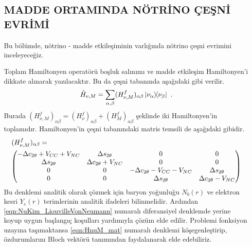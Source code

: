 \subsection{MADDE ORTAMINDA NÖTRİNO ÇEŞNİ EVRİMİ}\label{subsec:MaddeOrtamindaNuEvrimi}
\paragraph{}
Bu bölümde, nötrino - madde etkileşiminin varlığında nötrino çeşni evrimini inceleyeceğiz.

Toplam Hamiltonyen operatörü boşluk salınımı ve madde etkileşim Hamiltonyen'i dikkate alınarak yazılacaktır. Bu da çeşni tabanında aşağıdaki gibi verilir.
\begin{equation}
	\hat{H}_{\nu,M} = \sum_{\alpha,\beta} (H^{f}_{\nu,M})_{\alpha\beta} \dyad{\nu_{\alpha}}{\nu_{\beta}} \text{ .}
\end{equation}
Burada $ (H^{f}_{\nu,M})_{\alpha\beta} = (H^{f}_{\nu})_{\alpha\beta}+(H^{f}_{M})_{\alpha\beta} $ şeklinde iki Hamiltonyen'in toplamıdır. Hamiltonyen'in çeşni tabanındaki matris temsili de aşağıdaki gibidir.
\begin{align}\label{eqn:HnuM_mat}
	\nonumber&(H^{f}_{\nu,M})_{\alpha\beta} =\\ &\mqty(-\Delta c_{ 2\theta}+V_{CC}+V_{NC} & \Delta s_{ 2\theta} & 0 & 0\\ \Delta s_{ 2\theta} & \Delta c_{ 2\theta}+V_{NC} & 0 & 0 \\0 & 0 & -\Delta c_{ 2\theta}-V_{CC}-V_{NC} & \Delta s_{ 2\theta}\\ 0 & 0 & \Delta s_{ 2\theta} & \Delta c_{ 2\theta}-V_{NC} )
\end{align}
Bu denklemi analitik olarak çözmek için baryon yoğunluğu $ N_{b}(r) $ ve elektron kesri $ Y_{e}(r) $ terimlerinin analitik ifadeleri bilinmelidir. Ardından \eqref{eqn:NuKim_LiouvilleVonNeumann} numaralı diferansiyel denklemde yerine koyup uygun başlangıç koşulları yardımıyla çözüm elde edilir. Problemi fonksiyon uzayına taşımaktansa \eqref{eqn:HnuM_mat} numaralı denklemi köşegenleştirip, özdurumlarını Bloch vektörü tanımından faydalanarak elde edebiliriz. 

